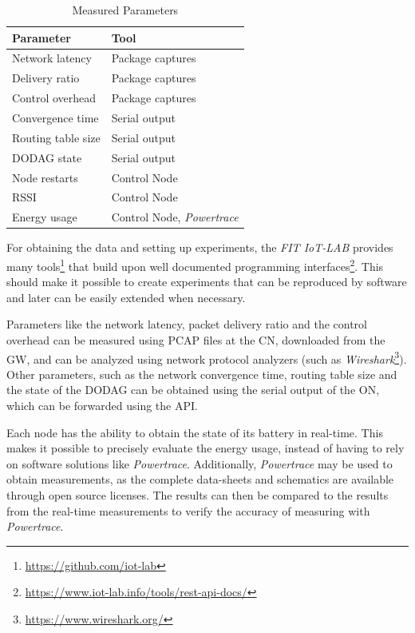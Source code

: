 \documentclass[
  a4paper,
  11pt,
  style=screen,
  extramargin,
  bcor=10mm,
  rgb,
  hyperrefdark,
  abstract=off,
  lnum,
]{tubsartcl}
\newcommand{\fitlab}{\emph{FIT IoT-LAB} }
\begin{document}
\begin{table}[h]
  \centering
  \caption{Measured Parameters}
  \label{tab:params}
  \begin{tabular}{ll}
    \toprule
    Parameter & Tool \\
    \midrule
    Network latency & Package captures \\
    Delivery ratio & Package captures \\
    Control overhead & Package captures \\
    Convergence time & Serial output \\
    Routing table size & Serial output \\
    DODAG state & Serial output \\
    Node restarts & Control Node \\
    RSSI & Control Node \\
    Energy usage & Control Node, \emph{Powertrace} \\
  \end{tabular}
\end{table}

For obtaining the data and setting up experiments, the \fitlab provides many tools\footnote{\url{https://github.com/iot-lab}} that build upon well documented programming interfaces\footnote{\url{https://www.iot-lab.info/tools/rest-api-docs/}}.
This should make it possible to create experiments that can be reproduced by software and later can be easily extended when necessary.

Parameters like the network latency, packet delivery ratio and the control overhead can be measured using \ac{PCAP} files at the \ac{CN}, downloaded from the \ac{GW}, and can be analyzed using network protocol analyzers (such as \emph{Wireshark}\footnote{\url{https://www.wireshark.org/}}).
Other parameters, such as the network convergence time, routing table size and the state of the \ac{DODAG} can be obtained using the serial output of the \ac{ON}, which can be forwarded using the \ac{API}.

Each node has the ability to obtain the state of its battery in real-time.
This makes it possible to precisely evaluate the energy usage, instead of having to rely on software solutions like \emph{Powertrace}.
Additionally, \emph{Powertrace} may be used to obtain measurements, as the complete data-sheets and schematics are available through open source licenses.
The results can then be compared to the results from the real-time measurements to verify the accuracy of measuring with \emph{Powertrace}.
\end{document}
